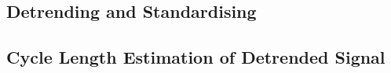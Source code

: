 \documentclass[../../CompleteThesis2/Complete_2ndDraft]{subfiles}
\begin{document}
\subsection[Standardisation]{Detrending and Standardising}
\label{Subsec:SignalAnalysis_Restoration_Standardisation}

\subsection[Cycle Length Estimation][Cycle Length Estimation]{Cycle Length Estimation of Detrended Signal}
\label{Subsec:SignalAnalysis_Restoration_CycleLengthEst}
\end{document}
